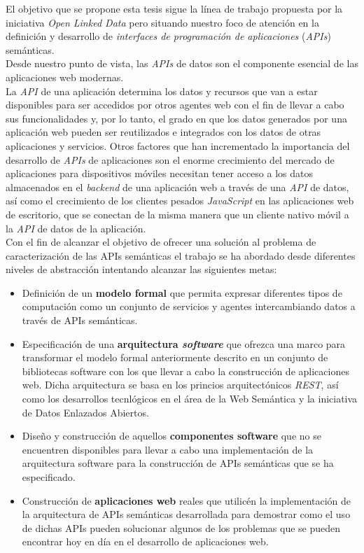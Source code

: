 El objetivo que se propone esta tesis sigue la l\'inea de trabajo propuesta por la iniciativa {\it Open Linked Data} pero situando nuestro foco de atenci\'on en la definici\'on y desarrollo de {\it interfaces de programaci\'on de aplicaciones} ({\it APIs}) sem\'anticas.\\
Desde nuestro punto de vista, las {\it APIs} de datos son el componente esencial de las aplicaciones web modernas.\\
La {\it API} de una aplicaci\'on determina los datos y recursos que van a estar disponibles para ser accedidos por otros agentes web con el fin de llevar a cabo sus funcionalidades y, por lo tanto, el grado en que los datos generados por una aplicaci\'on web pueden ser reutilizados e integrados con los datos de otras aplicaciones y servicios. Otros factores que han incrementado la importancia del desarrollo de {\it APIs} de aplicaciones son el enorme crecimiento del mercado de aplicaciones para dispositivos m\'oviles necesitan tener acceso a los datos almacenados en el {\it backend} de una aplicaci\'on web a trav\'es de una {\it API} de datos, as\'i como el crecimiento de los clientes pesados {\it JavaScript} en las aplicaciones web de escritorio, que se conectan de la misma manera que un cliente nativo m\'ovil a la {\it API} de datos de la aplicaci\'on.\\
Con el fin de alcanzar el objetivo de ofrecer una soluci\'on al problema de caracterizaci\'on de las APIs sem\'anticas el trabajo se ha abordado desde diferentes niveles de abstracci\'on intentando alcanzar las siguientes metas:

\begin{itemize}
  \item Definici\'on de un \textbf{modelo formal} que permita expresar diferentes tipos de computaci\'on como un conjunto de servicios y agentes intercambiando datos a trav\'es de APIs sem\'anticas.
  \item Especificaci\'on de una \textbf{arquitectura \textit{software}} que ofrezca una marco para transformar el modelo formal anteriormente descrito en un conjunto de bibliotecas software con los que llevar a cabo la construcci\'on de aplicaciones web. Dicha arquitectura se basa en los princios arquitect\'onicos \textit{REST}, as\'i como los desarrollos tecnl\'ogicos en el \'area de la Web Sem\'antica y la iniciativa de Datos Enlazados Abiertos.
  \item Dise\~no y construcci\'on de aquellos \textbf{componentes software} que no se encuentren disponibles para llevar a cabo una implementaci\'on de la arquitectura software para la construcci\'on de APIs sem\'anticas que se ha especificado.
  \item Construcci\'on de \textbf{aplicaciones web} reales que utilic\'en la implementaci\'on de la arquitectura de APIs sem\'anticas desarrollada para demostrar como el uso de dichas APIs pueden solucionar algunos de los problemas que se pueden encontrar hoy en d\'ia en el desarrollo de aplicaciones web.
\end{itemize}

